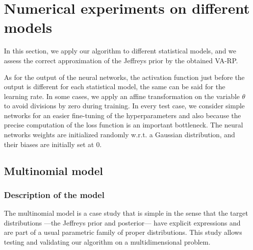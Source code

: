 \section{Numerical experiments on different models}\label{sec:VARP:experiments}

In this section, we apply our algorithm to different statistical models, and we assess the correct approximation of the Jeffreys prior by the obtained VA-RP. %

As for the output of the neural networks, the activation function just before the output is different for each statistical model, the same can be said for the learning rate. In some cases, we apply an affine transformation on the variable $\theta$ to avoid divisions by zero during training. In every test case, we consider simple networks for an easier fine-tuning of the hyperparameters and also because the precise computation of the loss function is an important bottleneck.
The neural networks weights are initialized randomly w.r.t. a Gaussian distribution, and their biases are initially set at $0$. %




\subsection{Multinomial model}  %

\subsubsection{Description of the model}

The multinomial model is a case study that is simple in the sense that the target distributions ---the Jeffreys prior and posterior--- have explicit expressions and are part of a usual parametric family of proper distributions. This study allows testing and validating our algorithm on a multidimensional problem.



